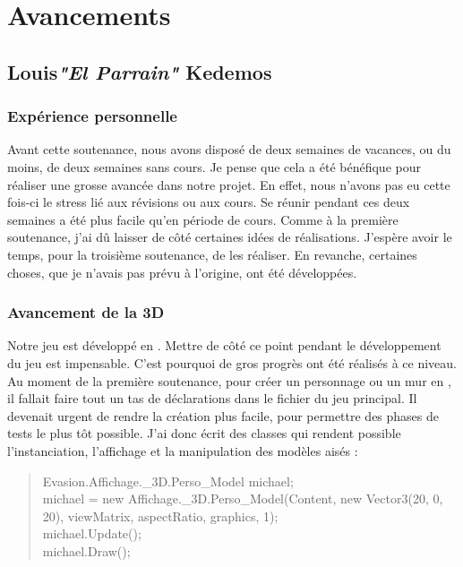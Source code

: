 \documentclass{article}
\begin{document}
\newpage

\section{Avancements}
\subsection{Louis\textcolor{pseudoblue}{\textit{"El Parrain"}} Kedemos}

\subsubsection{Expérience personnelle}
Avant cette soutenance, nous avons disposé de deux semaines de vacances, ou du moins, de deux semaines sans cours. Je pense que cela a été bénéfique pour réaliser une grosse avancée dans notre projet. En effet, nous n'avons pas eu cette fois-ci le stress lié aux révisions ou aux cours. Se réunir pendant ces deux semaines a été plus facile qu'en période de cours. \newline
Comme à la première soutenance, j'ai dû laisser de côté certaines idées de réalisations. J'espère avoir le temps, pour la troisième soutenance, de les réaliser. En revanche, certaines choses, que je n'avais pas prévu à l'origine, ont été développées.

\subsubsection{Avancement de la 3D}
Notre jeu est développé en . Mettre de côté ce point pendant le développement du jeu est impensable. C'est pourquoi de gros progrès ont été réalisés à ce niveau. Au moment de la première soutenance, pour créer un personnage ou un mur en , il fallait faire tout un tas de déclarations dans le fichier du jeu principal. Il devenait urgent de rendre la création  plus facile, pour permettre des phases de tests le plus tôt possible. J'ai donc écrit des classes qui rendent possible l'instanciation, l'affichage et la manipulation des modèles  aisés :

\begin{quote}
\textcolor{texteGris}{
Evasion.Affichage.\_3D.Perso\_Model michael;\\
michael = new Affichage.\_3D.Perso\_Model(Content, new Vector3(20, 0, 20), viewMatrix, aspectRatio, graphics, 1);\\
michael.Update();\\
michael.Draw();}
\end{quote}
\end{document}
